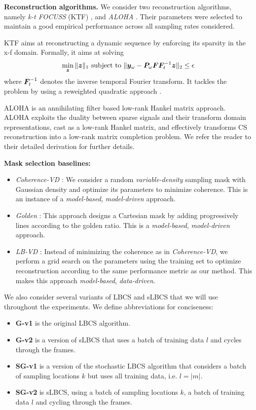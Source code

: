 \textbf{Reconstruction algorithms.}  We consider two reconstruction algorithms, namely \textit{k-t FOCUSS} (KTF) \citep{jung2009k},  and \textit{ALOHA} \citep{jin2016general}.  Their parameters were selected to maintain a good empirical performance across all sampling rates considered.

KTF aims at reconstructing a dynamic sequence by enforcing its sparsity in the x-f domain. Formally, it aims at solving
$$
\min_{\bm{z}} \|{\bm{z}}\|_1 \text{~subject to~} \|{\bm{y}}_\omega - {\bm{P}}_\omega {\bm{F}} {\bm{F}}_t^{-1} {\bm{z}}  \|_2 \leq \epsilon
$$
where ${\bm{F}}_t^{-1}$ denotes the inverse temporal Fourier transform. It tackles the problem by using a reweighted quadratic approach \citep{jung2007generalized}.

ALOHA \citep{jin2016general} is an annihilating filter based low-rank Hankel matrix approach. ALOHA exploits the duality between sparse signals and their transform domain representations, cast as a low-rank Hankel matrix, and effectively transforms CS reconstruction into a low-rank matrix completion problem.  We refer the reader to their detailed derivation for further details.

\textbf{Mask selection baselines:}

\begin{itemize}
\item\textit{Coherence-VD} \citep{lustig2007sparse}: We consider a random \textit{variable-density} sampling mask with Gaussian density and optimize its parameters to minimize coherence. This is an instance of a \textit{model-based}, \textit{model-driven} approach.

\item \textit{Golden} \citep{li2018dynamic}: This approach designs a Cartesian mask by adding progressively lines according to the golden ratio. This is a \textit{model-based}, \textit{model-driven} approach.

\item\textit{LB-VD} \citep{gozcu2018learning,gozcu2019rethinking}: Instead of minimizing the coherence as in \textit{Coherence-VD}, we perform a grid search on the parameters using the training set to optimize reconstruction according to the same performance metric as our method. This makes this approach \textit{model-based}, \textit{data-driven}.

\end{itemize}

We also consider several variants of LBCS and sLBCS that we will use throughout the experiments. We define abbreviations for conciseness:
\begin{itemize}
    \item \textbf{G-v1} is the original LBCS algorithm.
    \item \textbf{G-v2} is a version of sLBCS that uses a batch of training data $l$ and cycles through the frames.
    \item \textbf{SG-v1} is a version of the stochastic LBCS algorithm that considers a batch of sampling locations $k$ but uses all training data, i.e. $l = |m|$.
    \item \textbf{SG-v2} is sLBCS, using a batch of sampling locations $k$, a batch of training data $l$ and cycling through the frames.
\end{itemize}

